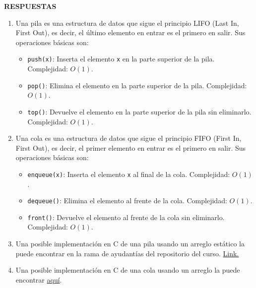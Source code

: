 \documentclass[12pt]{article}
\begin{document}
    \newpage
        \begin{center}
            \textbf{RESPUESTAS}
        \end{center}

        \begin{enumerate}
            \item Una pila es una estructura de datos que sigue el principio LIFO (Last In, First Out), es decir, el último elemento en entrar es el primero en salir. Sus operaciones básicas son:

            \begin{itemize}
                \item \texttt{push(x)}: Inserta el elemento \texttt{x} en la parte superior de la pila. Complejidad: \(O(1)\).
                \item \texttt{pop()}: Elimina el elemento en la parte superior de la pila. Complejidad: \(O(1)\).
                \item \texttt{top()}: Devuelve el elemento en la parte superior de la pila sin eliminarlo. Complejidad: \(O(1)\).
            \end{itemize}


            \item Una cola es una estructura de datos que sigue el principio FIFO (First In, First Out), es decir, el primer elemento en entrar es el primero en salir. Sus operaciones básicas son:

            \begin{itemize}
                \item \texttt{enqueue(x)}: Inserta el elemento \texttt{x} al final de la cola. Complejidad: \(O(1)\).
                \item \texttt{dequeue()}: Elimina el elemento al frente de la cola. Complejidad: \(O(1)\).
                \item \texttt{front()}: Devuelve el elemento al frente de la cola sin eliminarlo. Complejidad: \(O(1)\).
            \end{itemize}


            \item Una posible implementación en C de una pila usando un arreglo estático la puede encontrar en la rama de ayudantías del repositorio del curso. \href{https://github.com/otrab/EDA/tree/ayudant%C3%ADas}{Link.}
            
            \item Una posible implementación en C de una cola usando un arreglo la puede encontrar \href{https://github.com/otrab/EDA/tree/ayudant%C3%ADas}{aquí}.
            

\end{enumerate}
\end{document}
